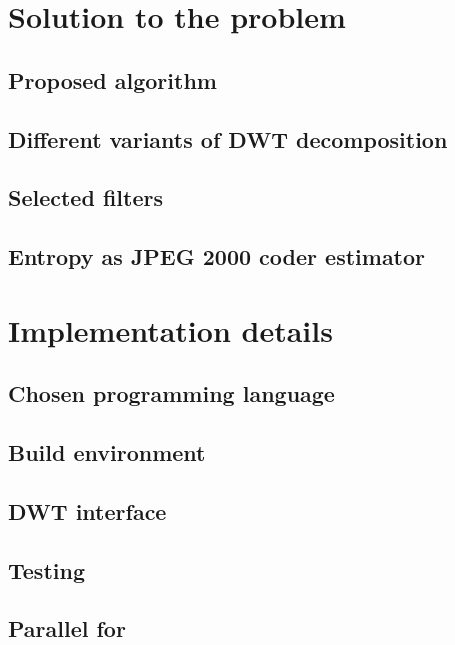 \section{Solution to the problem}

\subsection{Proposed algorithm}

\subsection{Different variants of DWT decomposition}

\subsection{Selected filters}

\subsection{Entropy as JPEG 2000 coder estimator}


\section{Implementation details}

\subsection{Chosen programming language}

\subsection{Build environment}

\subsection{DWT interface}

\subsection{Testing}

\subsection{Parallel for}

